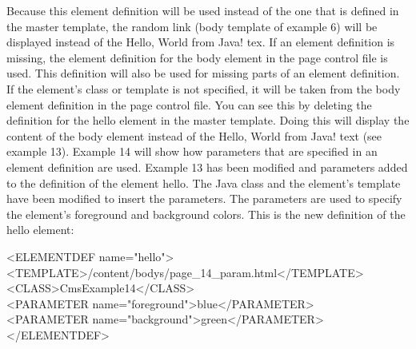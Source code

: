 Because this element definition will be used instead of the one that is
defined in the master template, the random link (body template of
example 6) will be displayed instead of the {\name Hello, World from Java!}
tex.
If an element definition is missing, the element definition for the
body element in the page control file is used. This definition will
also be used for missing parts of an element definition. If the
element's class or template is not specified, it will be taken from the
body element definition in the page control file.
You can see this by deleting the definition for the {\name hello} element in
the master template. Doing this will display the content of the body
element instead of the {\name Hello, World from Java!} text (see example 13).
Example 14 will show how parameters that are specified in an element
definition are used. Example 13 has been modified and parameters added
to the definition of the element {\name hello.} The Java class and the
element's template have been modified to insert the parameters. The
parameters are used to specify the element's foreground and background
colors. This is the new definition of the {\name hello} element:

\begin{java}
<ELEMENTDEF name="hello">\\
<TEMPLATE>/content/bodys/page\_14\_param.html</TEMPLATE>\\
<CLASS>CmsExample14</CLASS>\\
<PARAMETER name="foreground">blue</PARAMETER>\\
<PARAMETER name="background">green</PARAMETER>\\
</ELEMENTDEF>\\
\end{java}


